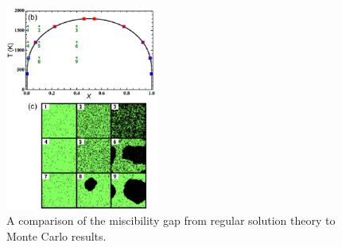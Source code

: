 \documentclass[12pt]{article}
\begin{document}
\begin{figure}[h]
\centering
\includegraphics[width=5cm]{regularsolutionsandBraggwilliamsnotes_gr3}
\caption{A comparison of the miscibility gap from regular solution theory to Monte Carlo results.}
\label{solutionToMiscGap}
\end{figure}
\end{document}
